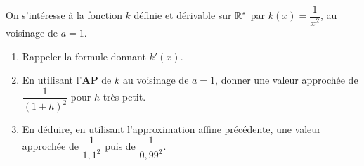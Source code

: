 \documentclass[a4paper,11pt]{article}
\begin{document}
\begin{cblocdm}[ n°3]
On s'intéresse à la fonction $k$ définie et dérivable sur $\R^*$ par $k(x)=\dfrac{1}{x^2}$, au voisinage de $a=1$.
%
\begin{enumerate}[noitemsep,topsep=4pt]
	\item Rappeler la formule donnant $k'(x)$.
	\item En utilisant l'\textbf{AP} de $k$ au voisinage de $a=1$, donner une valeur approchée de $\dfrac{1}{(1+h)^2}$ pour $h$ très petit.
	\item En déduire, \uline{en utilisant l'approximation affine précédente}, une valeur approchée de $\dfrac{1}{1,1^2}$ puis de $\dfrac{1}{0,99^2}$.
\end{enumerate}
\end{cblocdm}
\end{document}
